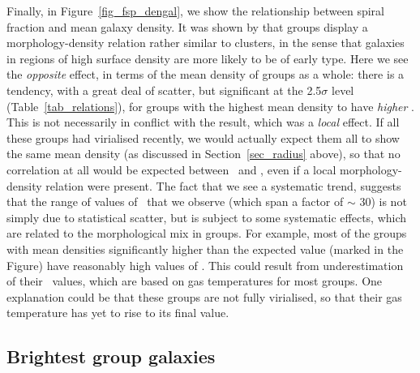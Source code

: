 \documentclass[usenatbib]{mn2e}
\begin{document}
Finally, in Figure~\ref{fig_fsp_dengal}, we show the relationship between
spiral fraction and mean galaxy density.  It was shown by \citet{helsdon03a} that
groups display a morphology-density relation rather similar to clusters, in the
sense that galaxies in regions of high surface density are more likely to be of
early type.  Here we see the {\it opposite} effect, in terms of the mean density
of groups as a whole: there is a tendency, with a great deal of scatter, but
significant at the 2.5$\sigma$ level (Table~\ref{tab_relations}), for groups with
the highest mean density to have {\it higher} \fsp. This is not necessarily in
conflict with the \citet{helsdon03a} result, which was a {\it local} effect.  If
all these groups had virialised recently, we would actually expect them all to
show the same mean density (as discussed in Section~\ref{sec_radius} above), so
that no correlation at all would be expected between \fsp\ and \dengal, even if a
local morphology-density relation were present. The fact that we see a systematic
trend, suggests that the range of values of \dengal\ that we observe (which span
a factor of $\sim$ 30) is not simply due to statistical scatter, but is subject
to some systematic effects, which are related to the morphological mix in groups.
For example, most of the groups with mean densities significantly higher than the
expected value (marked in the Figure) have reasonably high values of \fsp. This
could result from underestimation of their \rfh\ values, which are based on gas
temperatures for most groups. One explanation could be that these groups are not
fully virialised, so that their gas temperature has yet to rise to its final
value.


\subsection{Brightest group galaxies}
\label{subsec_bgg}
\end{document}
